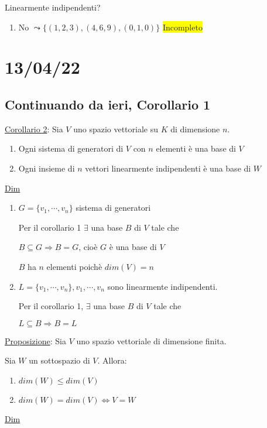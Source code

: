 \documentclass{article}
\newcommand{\hl}[1]{\colorbox{yellow}{#1}}
\newcommand{\ul}[1]{\underline{#1}}
\begin{document}
Linearmente indipendenti?
\begin{enumerate}
	\item No $\leadsto\{(1,2,3),(4,6,9),(0,1,0)\}$ \hl{Incompleto}
\end{enumerate}
\section{13/04/22}
\subsection{Continuando da ieri, Corollario 1}
\ul{Corollario 2}: Sia $V$ uno spazio vettoriale su $K$ di dimensione $n$.
\begin{enumerate}
	\item Ogni sistema di generatori di $V$ con $n$ elementi è una base di $V$
	\item Ogni insieme di $n$ vettori linearmente indipendenti è una base di $W$
\end{enumerate}

\ul{Dim}
\begin{enumerate}
	\item $G=\{v_1,\cdots,v_n\}$ sistema di generatori

	      Per il corollario 1 $\exists$ una base $B$ di $V$ tale che

	      $B\subseteq G\Rightarrow B=G$, cioè $G$ è una base di $V$

	      $B$ ha $n$ elementi poichè $dim(V)=n$
	\item $L=\{v_1,\cdots,v_n\},v_1,\cdots,v_n$ sono linearmente indipendenti.

	      Per il corollario 1, $\exists$ una base $B$ di $V$ tale che

	      $L\subseteq B\Rightarrow B=L$
\end{enumerate}

\ul{Proposizione}: Sia $V$ uno spazio vettoriale di dimensione finita.

Sia $W$ un sottospazio di $V$. Allora:
\begin{enumerate}
	\item $dim(W)\le dim(V)$
	\item $dim(W)=dim(V)\Leftrightarrow V=W$
\end{enumerate}

\ul{Dim}
\end{document}
